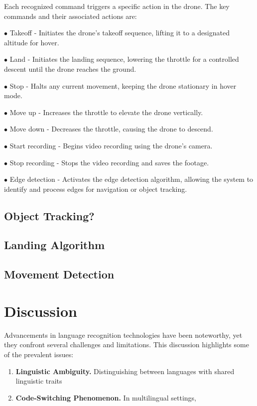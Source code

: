 \documentclass[3p,times]{elsarticle}
\begin{document}
Each recognized command triggers a specific action in the drone. The key commands and their associated actions are:
\begin{description}
\item $\bullet$ Takeoff - Initiates the drone's takeoff sequence, lifting it to a designated altitude for hover.
\item $\bullet$ Land - Initiates the landing sequence, lowering the throttle for a controlled descent until the drone reaches the ground.
\item $\bullet$ Stop - Halts any current movement, keeping the drone stationary in hover mode.
\item $\bullet$ Move up - Increases the throttle to elevate the drone vertically.
\item $\bullet$ Move down - Decreases the throttle, causing the drone to descend.
\item $\bullet$ Start recording - Begins video recording using the drone's camera.
\item $\bullet$ Stop recording - Stops the video recording and saves the footage.
\item $\bullet$ Edge detection - Activates the edge detection algorithm, allowing the system to identify and process edges for navigation or object tracking.

\end{description}
\subsection{Object Tracking?}
\subsection{Landing Algorithm}
\subsection{Movement Detection}

\section{Discussion} \label{sec:discussion}

Advancements in language recognition technologies have been noteworthy, yet they confront several challenges and limitations. This discussion highlights some of the prevalent issues:

\begin{enumerate}

    \item \textbf{Linguistic Ambiguity.} Distinguishing between languages with shared linguistic traits

    \item \textbf{Code-Switching Phenomenon.} In multilingual settings,

\end{enumerate}
\end{document}

